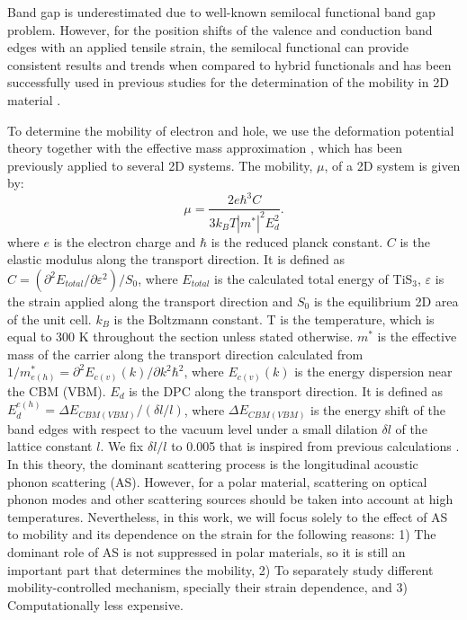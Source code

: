 Band gap is underestimated due to well-known semilocal functional band gap problem. However, for the position shifts of the valence and conduction band edges with an applied tensile strain, the semilocal functional can provide consistent results and trends when compared to hybrid functionals and has  been successfully used in  previous studies for the determination of the mobility in 2D material \cite{Meng-Qiu2009,Yongqing2014,fei}. 

To determine the mobility of electron and  hole, we use the deformation potential theory together with the effective mass approximation \cite{Bardeen1950}, which has been previously applied to several 2D systems\cite{Xi2012,Qiao2014a,Dai2015,Kang2015}.
The mobility, $\mu$, of a 2D system is given by: 
\begin{equation} \label{equ}
\mu=\frac{2e\hbar^3C}{3k_BT|m^*|^2E_d^2}.
\end{equation}
where $e$ is the electron charge and $\hbar$ is the reduced planck constant. $C$ is the elastic modulus along the transport direction. It is defined as $C=(\partial^2E_{total}/\partial\varepsilon^2)/S_0$, where $E_{total}$ is the calculated total energy of TiS$_3$, $\varepsilon$ is the strain applied along the transport direction and $S_0$ is the equilibrium 2D area of the unit cell. $k_B$ is the Boltzmann constant. T is the temperature, which is equal to 300 K throughout the section unless stated otherwise. $m^*$ is the effective mass of the carrier along the transport direction calculated from $1/m^*_{e(h)}=\partial^2E_{c(v)}(k)/\partial k^2\hbar^2$, where $E_{c(v)}(k)$ is the energy dispersion near the CBM (VBM). $E_d$ is the DPC along the transport direction. It is defined as $E_d^{e(h)}=\Delta E_{CBM(VBM)}/(\delta l/l)$, where $\Delta E_{CBM(VBM)}$ is the energy shift of the band edges with respect to the vacuum level under a small dilation $\delta l$ of the lattice constant $l$. We fix $\delta l/l$ to 0.005 that is inspired from previous calculations \cite{Dai2015}. In this theory,  the dominant scattering process is the longitudinal acoustic phonon scattering (AS). However, for a polar material, scattering on  optical phonon modes and other scattering sources should be taken into account at high temperatures\cite{Kaasbjerg2012}. Nevertheless, in this work, we will focus solely to the effect of AS to mobility and its dependence on the strain for the following reasons: 1) The dominant role of AS is not suppressed in polar materials, so it is still an important part that determines the mobility, 2) To separately study different mobility-controlled mechanism, specially their strain dependence, and 3) Computationally less expensive. 


